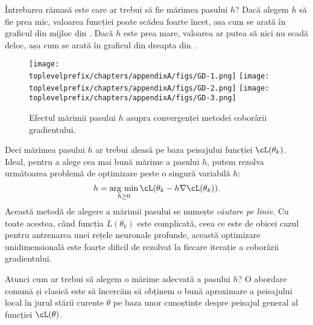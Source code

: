\documentclass[../../book-main_ro.tex]{subfiles}
\begin{document}
Întrebarea rămasă este care ar trebui să fie mărimea pasului $h$? Dacă alegem $h$ să fie prea mic, valoarea funcției poate scădea foarte încet, așa cum se arată în graficul din mijloc din . Dacă $h$ este prea mare, valoarea ar putea să nici nu scadă deloc, așa cum se arată în graficul din dreapta din .

\begin{figure}[h]
    \centering
    \texttt{[image: \\toplevelprefix/chapters/appendixA/figs/GD-1.png]}
    \hspace{3mm}
    \texttt{[image: \\toplevelprefix/chapters/appendixA/figs/GD-2.png]}
    \hspace{3mm}
    \texttt{[image: \\toplevelprefix/chapters/appendixA/figs/GD-3.png]}
    \caption{Efectul mărimii pasului $h$ asupra convergenței metodei coborârii gradientului.}
    \label{fig:step-size}
\end{figure}

Deci mărimea pasului $h$ ar trebui aleasă pe baza peisajului funcției $\cL(\theta_k)$. Ideal, pentru a alege cea mai bună mărime a pasului $h$, putem rezolva următoarea problemă de optimizare peste o singură variabilă $h$:
\begin{equation}
    h = \argmin_{h\geq 0} \cL(\theta_k - h\nabla \cL(\theta_k)).
\end{equation}
Această metodă de alegere a mărimii pasului se numește \textit{căutare pe linie}. Cu toate acestea, când funcția $L(\theta_k)$ este complicată, ceea ce este de obicei cazul pentru antrenarea unei rețele neuronale profunde, această optimizare unidimensională este foarte dificil de rezolvat la fiecare iterație a coborârii gradientului.

Atunci cum ar trebui să alegem o mărime adecvată a pasului $h$? O abordare comună și clasică este să încercăm să obținem o bună aproximare a peisajului local în jurul stării curente $\theta$ pe baza unor cunoștințe despre peisajul general al funcției $\cL(\theta)$.
\end{document}
